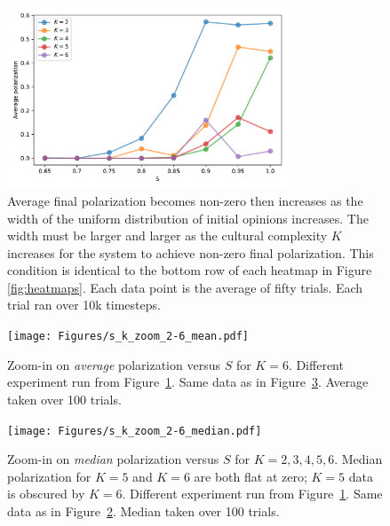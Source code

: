 \documentclass[11pt,letterpaper]{article}
\begin{document}
\begin{figure}[t!]
  \centering
  \includegraphics[width=0.75\textwidth]{Figures/P_vs_S_for_K.pdf}
  \caption{
    Average final polarization becomes non-zero then increases as
    the width of the uniform distribution of initial opinions increases.
    The width must be larger and larger as the cultural complexity $K$ 
    increases for the system to achieve non-zero final polarization. This
    condition is identical to the bottom row of each heatmap in 
    Figure \ref{fig:heatmaps}. Each
    data point is the average of fifty trials. Each trial ran over 
    10k timesteps. 
  }
  \label{fig:p_vs_s_for_k}
\end{figure}


\begin{figure}[t!]
  \centering
    \texttt{[image: Figures/s\_k\_zoom\_2-6\_mean.pdf]}
  \caption{Zoom-in on \emph{average} polarization versus $S$ for $K=6$. 
  Different experiment run from Figure~\ref{fig:p_vs_s_for_k}. 
  Same data as in Figure~\ref{fig:zoom_median}.
  Average taken over 100 trials.}
  \label{fig:zoom_average}
\end{figure}

\begin{figure}[h!]
  \centering
    \texttt{[image: Figures/s\_k\_zoom\_2-6\_median.pdf]}
  \caption{Zoom-in on \emph{median} polarization versus $S$ for $K=2,3,4,5,6$. 
    Median polarization for $K=5$ and $K=6$ are both flat at zero; $K=5$ 
    data is obscured by $K=6$.
    Different experiment run from Figure~\ref{fig:p_vs_s_for_k}.
    Same data as in Figure~\ref{fig:zoom_average}.
    Median taken over 100 trials.
  }
  \label{fig:zoom_median}
\end{figure}

\end{document}
